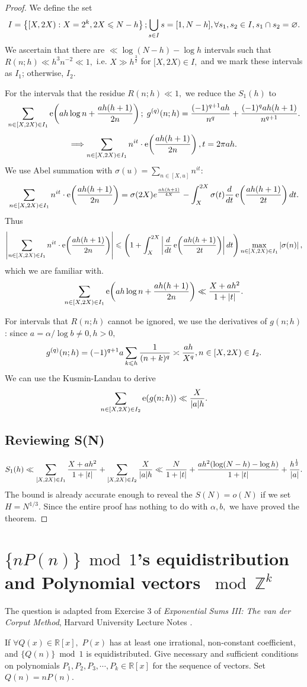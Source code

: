 \begin{proof}
We define the set $$I = \left\{ [X, 2X): X = 2^k, 2X \leqslant N-h \right\}; \bigcup_{s \in I}s = [1,N-h], \forall s_1, s_2 \in I, s_1 \cap s_2 = \varnothing.$$ We ascertain that there are $\ll \log (N-h)-\log h$ intervals such that $R(n;h) \ll h^3n^{-2} \ll 1,$ i.e. $X \gg h^\frac{3}{2}$ for $[X, 2X) \in I,$ and we mark these intervals as $I_1$; otherwise, $I_2.$

For the intervals that the residue $R(n;h) \ll 1,$ we reduce the $S_1(h)$ to $$\sum_{n \in [X, 2X) \in I_1} \operatorname{e} \! \left( ah\log n + \frac{ah(h+1)}{2n} \right); \; g^{(q)}(n;h) = \frac{(-1)^{q+1}ah}{n^q} + \frac{(-1)^{q}ah(h+1)}{n^{q+1}}.$$ $$\Longrightarrow \sum_{n \in [X, 2X) \in I_1} n^{it} \cdot \operatorname{e} \! \left( \frac{ah(h+1)}{2n} \right), t = 2\pi ah.$$ We use Abel summation with $\sigma(u) = \sum_{n \in [X,u]} n^{it}$: $$\sum_{n \in [X, 2X) \in I_1} n^{it} \cdot \operatorname{e} \! \left( \frac{ah(h+1)}{2n} \right) = \sigma(2X) e^{\frac{ah(h+1)}{4X}} - \int_{X}^{2X} \sigma(t) \frac{d}{dt}\operatorname{e} \! \left( \frac{ah(h+1)}{2t} \right)dt.$$ Thus $$\left\lvert \sum_{n \in [X, 2X) \in I_1} n^{it} \cdot \operatorname{e} \! \left( \frac{ah(h+1)}{2n} \right) \right\rvert \leqslant \left( 1 + \int_{X}^{2X} \left\lvert \frac{d}{dt} \operatorname{e} \! \left( \frac{ah(h+1)}{2t} \right) \right\rvert dt \right) \max_{n \in [X, 2X) \in I_1} \left\lvert \sigma(n) \right\rvert,$$ which we are familiar with. $$\sum_{n \in [X, 2X) \in I_1} \operatorname{e} \! \left( ah\log n + \frac{ah(h+1)}{2n} \right) \ll \frac{X+ah^2}{1+\left\lvert t \right\rvert}.$$

For intervals that $R(n;h)$ cannot be ignored, we use the derivatives of $g(n;h)$: since $a = \alpha/\log b \neq 0, h > 0,$ $$g^{(q)}(n;h) = (-1)^{q+1}a \sum_{k \leqslant h} \frac{1}{(n+k)^q} \asymp \frac{ah}{X^q}, n \in [X, 2X) \in I_2.$$ We can use the Kusmin-Landau to derive $$\sum_{n \in [X, 2X) \in I_2} \operatorname{e} \! \left( g(n;h) \right) \ll \frac{X}{|a|h}.$$

\subsection{Reviewing S(N)}
$$S_1(h) \ll \sum_{[X, 2X) \in I_1} \frac{X+ah^2}{1+\left\lvert t \right\rvert} + \sum_{[X, 2X) \in I_2}\frac{X}{|a|h} \ll \frac{N}{1+\left\lvert t \right\rvert} + \frac{ah^2(\log (N-h)-\log h)}{1+\left\lvert t \right\rvert} + \frac{h^\frac{1}{2}}{|a|}.$$ The bound is already accurate enough to reveal the $S(N) = o(N)$ if we set $H = N^{1/3}.$ Since the entire proof has nothing to do with $\alpha,b,$ we have proved the theorem.
\end{proof}

\section{$\{nP(n)\} \bmod{1}$'s equidistribution and Polynomial vectors $\bmod{\mathbb{Z}^k}$}
The question is adapted from Exercise 3 of \emph{Exponential Sums III: The van der Corput Method}, Harvard University Lecture Notes \cite{ElkiesVdC}.
\begin{theorem}
    If $\forall Q(x) \in \mathbb{R}[x],$ $P(x)$ has at least one irrational, non-constant coefficient, and $\{Q(n)\} \bmod{1}$ is equidistributed. Give necessary and sufficient conditions on polynomials $P_1, P_2, P_3,  \cdots , P_k \in \mathbb{R}[x]$ for the sequence of vectors. Set $Q(n) = nP(n).$
\end{theorem}

